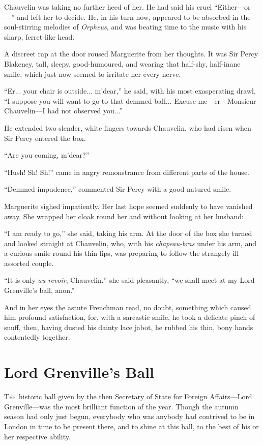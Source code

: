 \documentclass[paper=a5,BCOR=7mm,twoside,DIV=calc,12pt,usegeometry,chapterprefix,endperiod,headings=big]{scrbook}
\begin{document}
Chauvelin was taking no further heed of her. He had said his cruel \enquote{Either---or---} and left her to decide. He, in his turn now, appeared to be absorbed in the soul-stirring melodies of \textit{Orpheus}, and was beating time to the music with his sharp, ferret-like head.

A discreet rap at the door roused Marguerite from her thoughts. It was Sir Percy Blakeney, tall, sleepy, good-humoured, and wearing that half-shy, half-inane smile, which just now seemed to irritate her every nerve.

\enquote{Er... your chair is outside... m'dear,} he said, with his most exasperating drawl, \enquote{I suppose you will want to go to that demmed ball... Excuse me---er---Monsieur Chauvelin---I had not observed you...}

He extended two slender, white fingers towards Chauvelin, who had risen when Sir Percy entered the box.

\enquote{Are you coming, m'dear?}

\enquote{Hush! Sh! Sh!} came in angry remonstrance from different parts of the house.

\enquote{Demmed impudence,} commented Sir Percy with a good-natured smile.

Marguerite sighed impatiently. Her last hope seemed suddenly to have vanished away. She wrapped her cloak round her and without looking at her husband:

\enquote{I am ready to go,} she said, taking his arm. At the door of the box she turned and looked straight at Chauvelin, who, with his \textit{chapeau-bras} under his arm, and a curious smile round his thin lips, was preparing to follow the strangely ill-assorted couple.

\enquote{It is only \textit{au revoir}, Chauvelin,} she said pleasantly, \enquote{we shall meet at my Lord Grenville's ball, anon.}

And in her eyes the astute Frenchman read, no doubt, something which caused him profound satisfaction, for, with a sarcastic smile, he took a delicate pinch of snuff, then, having dusted his dainty lace jabot, he rubbed his thin, bony hands contentedly together.

\chapter{Lord Grenville's Ball}
\lettrine[lines=4]{T}{he} historic ball given by the then Secretary of State for Foreign Affairs---Lord Grenville---was the most brilliant function of the year. Though the autumn season had only just begun, everybody who was anybody had contrived to be in London in time to be present there, and to shine at this ball, to the best of his or her respective ability.
\end{document}
